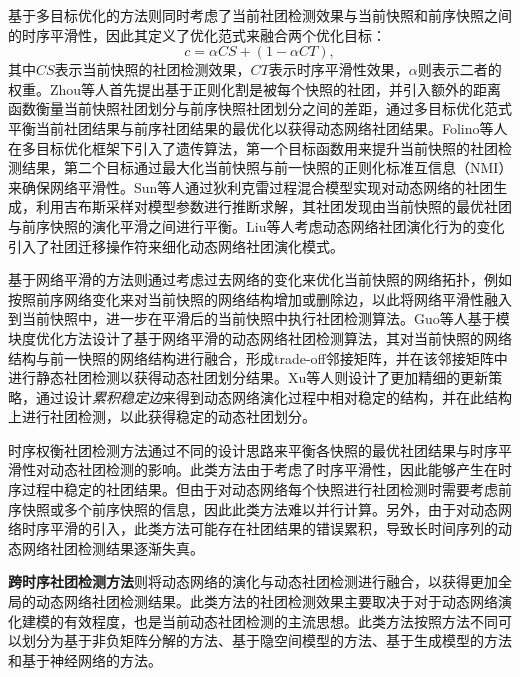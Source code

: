 基于多目标优化的方法则同时考虑了当前社团检测效果与当前快照和前序快照之间的时序平滑性，因此其定义了优化范式来融合两个优化目标：
\begin{equation}
c=\alpha CS+(1-\alpha CT),
\end{equation}
其中$CS$表示当前快照的社团检测效果，$CT$表示时序平滑性效果，$\alpha$则表示二者的权重。Zhou等人\cite{zhou2007discovering}首先提出基于正则化割是被每个快照的社团，并引入额外的距离函数衡量当前快照社团划分与前序快照社团划分之间的差距，通过多目标优化范式平衡当前社团结果与前序社团结果的最优化以获得动态网络社团结果。Folino等人\cite{folino2013evolutionary}在多目标优化框架下引入了遗传算法，第一个目标函数用来提升当前快照的社团检测结果，第二个目标通过最大化当前快照与前一快照的正则化标准互信息（NMI）来确保网络平滑性。Sun等人\cite{sun2013co}通过狄利克雷过程混合模型实现对动态网络的社团生成，利用吉布斯采样对模型参数进行推断求解，其社团发现由当前快照的最优社团与前序快照的演化平滑之间进行平衡。Liu等人\cite{liu2020detecting}考虑动态网络社团演化行为的变化引入了社团迁移操作符来细化动态网络社团演化模式。

基于网络平滑的方法则通过考虑过去网络的变化来优化当前快照的网络拓扑，例如按照前序网络变化来对当前快照的网络结构增加或删除边，以此将网络平滑性融入到当前快照中，进一步在平滑后的当前快照中执行社团检测算法。Guo等人\cite{guo2014evolutionary}基于模块度优化方法设计了基于网络平滑的动态网络社团检测算法，其对当前快照的网络结构与前一快照的网络结构进行融合，形成trade-off邻接矩阵，并在该邻接矩阵中进行静态社团检测以获得动态社团划分结果。Xu等人\cite{xu2013community}则设计了更加精细的更新策略，通过设计\textit{累积稳定边}来得到动态网络演化过程中相对稳定的结构，并在此结构上进行社团检测，以此获得稳定的动态社团划分。

时序权衡社团检测方法通过不同的设计思路来平衡各快照的最优社团结果与时序平滑性对动态社团检测的影响。此类方法由于考虑了时序平滑性，因此能够产生在时序过程中稳定的社团结果。但由于对动态网络每个快照进行社团检测时需要考虑前序快照或多个前序快照的信息，因此此类方法难以并行计算。另外，由于对动态网络时序平滑的引入，此类方法可能存在社团结果的错误累积，导致长时间序列的动态网络社团检测结果逐渐失真。


\textbf{跨时序社团检测方法}则将动态网络的演化与动态社团检测进行融合，以获得更加全局的动态网络社团检测结果。此类方法的社团检测效果主要取决于对于动态网络演化建模的有效程度，也是当前动态社团检测的主流思想。此类方法按照方法不同可以划分为基于非负矩阵分解的方法、基于隐空间模型的方法、基于生成模型的方法和基于神经网络的方法。

